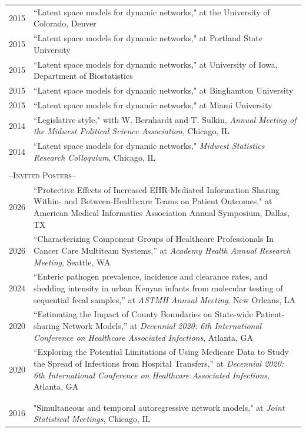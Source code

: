 \documentclass[11pt]{article}
\begin{document}
\begin{longtable}{r|p{15.5cm}}
2015 & ``Latent space models for dynamic networks," at the University of Colorado, Denver \\
2015 & ``Latent space models for dynamic networks," at Portland State University \\
2015 & ``Latent space models for dynamic networks," at University of Iowa, Department of Biostatistics \\
2015 & ``Latent space models for dynamic networks," at Binghamton University \\
2015 & ``Latent space models for dynamic networks," at Miami University \\
2014 & ``Legislative style," with W. Bernhardt and T. Sulkin, {\it Annual Meeting of the Midwest Political Science Association}, Chicago, IL \\
2014 & ``Latent space models for dynamic networks," {\it Midwest Statistics Research Colloquium}, Chicago, IL \\
\multicolumn{2}{l}{}\\
\multicolumn{2}{l}{\large--\textsc{Invited Posters}--\normalsize}\\
2026 & ``Protective Effects of Increased EHR-Mediated Information Sharing Within- and Between-Healthcare Teams on Patient Outcomes," at American Medical Informatics Association Annual Symposium, Dallas, TX\\
2026 & ``Characterizing Component Groups of Healthcare Professionals In Cancer Care Multiteam Systems,'' at {\it Academy Health Annual Research Meeting}, Seattle, WA \\
2024 & ``Enteric pathogen prevalence, incidence and clearance rates, and shedding intensity in urban Kenyan infants from molecular testing of sequential fecal samples,'' at {\it ASTMH Annual Meeting}, New Orleans, LA\\
2020 & ``Estimating the Impact of County Boundaries on State-wide Patient-sharing Network Models,'' at {\it Decennial 2020: 6th International Conference on Healthcare Associated Infections}, Atlanta, GA\\
2020 & ``Exploring the Potential Limitations of Using Medicare Data to Study the Spread of Infections from Hospital Transfers,'' at {\it Decennial 2020: 6th International Conference on Healthcare Associated Infections}, Atlanta, GA\\
\multicolumn{2}{l}{}\\ \newpage
\multicolumn{2}{l}{\large--\textsc{Contributed Talks}--\normalsize}\\
2016 & "Simultaneous and temporal autoregressive network models," at {\it Joint Statistical Meetings}, Chicago, IL \\

\end{longtable}
\end{document}
